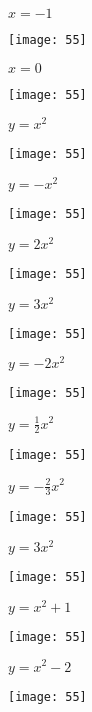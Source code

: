 \documentclass[a4paper]{oblivoir}
\begin{document}
\clearpage
\begin{minipage}{0.45\textwidth}\centering
\(x=-1\)
\par\bigskip\texttt{[image: 55]}
\end{minipage}
\begin{minipage}{0.45\textwidth}\centering
\(x=0\)
\par\bigskip\texttt{[image: 55]}
\end{minipage}\bigskip\bigskip\par
\begin{minipage}{0.45\textwidth}\centering
\(y=x^2\)
\par\bigskip\texttt{[image: 55]}
\end{minipage}
\begin{minipage}{0.45\textwidth}\centering
\(y=-x^2\)
\par\bigskip\texttt{[image: 55]}
\end{minipage}\bigskip\bigskip\par
\begin{minipage}{0.45\textwidth}\centering
\(y=2x^2\)
\par\bigskip\texttt{[image: 55]}
\end{minipage}
\begin{minipage}{0.45\textwidth}\centering
\(y=3x^2\)
\par\bigskip\texttt{[image: 55]}
\end{minipage}\bigskip\bigskip\par


\clearpage
\begin{minipage}{0.45\textwidth}\centering
\(y=-2x^2\)
\par\bigskip\texttt{[image: 55]}
\end{minipage}
\begin{minipage}{0.45\textwidth}\centering
\(y=\frac12x^2\)
\par\bigskip\texttt{[image: 55]}
\end{minipage}\bigskip\bigskip\par
\begin{minipage}{0.45\textwidth}\centering
\(y=-\frac23x^2\)
\par\bigskip\texttt{[image: 55]}
\end{minipage}
\begin{minipage}{0.45\textwidth}\centering
\(y=3x^2\)
\par\bigskip\texttt{[image: 55]}
\end{minipage}\bigskip\bigskip\par
\begin{minipage}{0.45\textwidth}\centering
\(y=x^2+1\)
\par\bigskip\texttt{[image: 55]}
\end{minipage}
\begin{minipage}{0.45\textwidth}\centering
\(y=x^2-2\)
\par\bigskip\texttt{[image: 55]}
\end{minipage}\bigskip\bigskip\par
\end{document}
